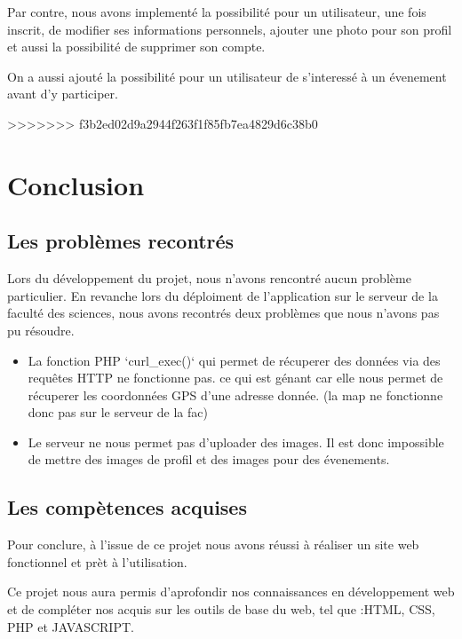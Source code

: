 \documentclass[oneside,11pt,a4paper]{article}
\begin{document}
Par contre, nous avons implementé la possibilité pour un utilisateur, une fois inscrit, de modifier ses informations personnels, ajouter une photo pour son profil et aussi la possibilité de supprimer son compte.

On a aussi ajouté la possibilité pour un utilisateur de s'interessé à un évenement avant d'y participer.

>>>>>>> f3b2ed02d9a2944f263f1f85fb7ea4829d6c38b0
\section{Conclusion}

\subsection{Les problèmes recontrés}

Lors du développement du projet, nous n'avons rencontré aucun problème particulier. En revanche lors du déploiment de l'application sur le serveur de la faculté des sciences, nous avons recontrés deux problèmes que nous n'avons pas pu résoudre.

\begin{itemize}
	\item La fonction PHP `curl\_exec()` qui permet de récuperer des données via des requêtes HTTP ne fonctionne pas. ce qui est génant car elle nous permet de récuperer les coordonnées GPS d'une adresse donnée. (la map ne fonctionne donc pas sur le serveur de la fac)
	\item Le serveur ne nous permet pas d'uploader des images. Il est donc impossible de mettre des images de profil et des images pour des évenements.
\end{itemize}

\subsection{Les compètences acquises}

Pour conclure, à l’issue de ce projet nous avons réussi à réaliser un site web fonctionnel et prèt à l'utilisation. 

Ce projet nous aura permis d’aprofondir nos connaissances en développement web et de compléter nos acquis sur les outils de base du web, tel que :HTML, CSS, PHP et JAVASCRIPT.
\end{document}
